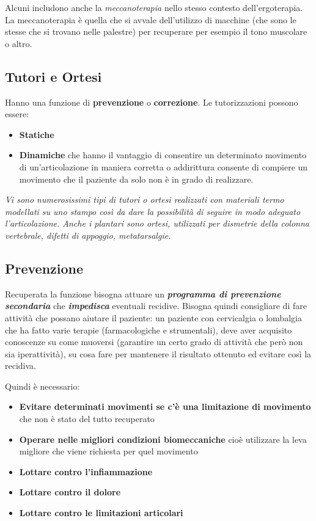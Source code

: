 Alcuni includono anche la \emph{meccanoterapia} nello stesso contesto dell'ergoterapia. La meccanoterapia è quella che si avvale dell'utilizzo di macchine (che sono le stesse che si trovano nelle palestre) per recuperare per esempio il tono muscolare o altro.

\subsection{Tutori e Ortesi}

Hanno una funzione di \textbf{prevenzione} o \textbf{correzione}. Le tutorizzazioni possono essere:

\begin{itemize}
\item
  \textbf{Statiche}
\item
  \textbf{Dinamiche} che hanno il vantaggio di consentire un determinato movimento di un'articolazione in maniera corretta o addirittura consente di compiere un movimento che il paziente da solo non è in grado di realizzare.
\end{itemize}

\emph{Vi sono numerosissimi tipi di tutori o ortesi realizzati con materiali termo modellati su uno stampo così da dare la possibilità di seguire in modo adeguato l'articolazione. Anche i plantari sono ortesi, utilizzati per dismetrie della colonna vertebrale, difetti di appoggio, metatarsalgie.}

\subsection{Prevenzione}

Recuperata la funzione bisogna attuare un \textbf{\emph{programma di prevenzione secondaria}} che \textbf{\emph{impedisca}} eventuali recidive. Bisogna quindi consigliare di fare attività che possano aiutare il paziente: un paziente con cervicalgia o lombalgia che ha
fatto varie terapie (farmacologiche e strumentali), deve aver acquisito conoscenze su come muoversi (garantire un certo grado di attività che però non sia iperattività), su cosa fare per mantenere il risultato ottenuto ed evitare così la recidiva.

Quindi è necessario:

\begin{itemize}
\item
  \textbf{Evitare determinati movimenti se c'è una limitazione di movimento} che non è stato del tutto recuperato
\item
  \textbf{Operare nelle migliori condizioni biomeccaniche} cioè utilizzare la leva migliore che viene richiesta per quel movimento
\item
  \textbf{Lottare contro l'infiammazione}
\item
  \textbf{Lottare contro il dolore }
\item
  \textbf{Lottare contro le limitazioni articolari}
\end{itemize}

